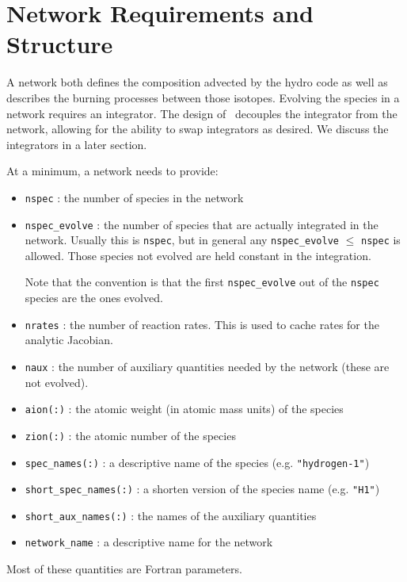 

\section{Network Requirements and Structure}

A network both defines the composition advected by the hydro code as
well as describes the burning processes between those isotopes.
Evolving the species in a network requires an integrator.  The design
of \microphysics\ decouples the integrator from the network, allowing
for the ability to swap integrators as desired.  We discuss the
integrators in a later section.


At a minimum, a network needs to provide:
\begin{itemize}
 \item {\tt nspec} : the number of species in the network

 \item {\tt nspec\_evolve} : the number of species that are actually
   integrated in the network.  Usually this is {\tt nspec}, but in general
   any {\tt nspec\_evolve} $\le$ {\tt nspec} is allowed.  Those species
   not evolved are held constant in the integration.

   Note that the convention is that the first {\tt nspec\_evolve} out
   of the {\tt nspec} species are the ones evolved.

 \item {\tt nrates} : the number of reaction rates.  This is used to
   cache rates for the analytic Jacobian.

 \item {\tt naux} : the number of auxiliary quantities needed by the
   network (these are not evolved).  

 \item {\tt aion(:)} : the atomic weight (in atomic mass units) of the
   species

 \item {\tt zion(:)} : the atomic number of the species

 \item {\tt spec\_names(:)} : a descriptive name of the species
   (e.g. {\tt "hydrogen-1"})

 \item {\tt short\_spec\_names(:)} : a shorten version of the species name
   (e.g. {\tt "H1"})

 \item {\tt short\_aux\_names(:)} : the names of the auxiliary quantities

 \item {\tt network\_name} : a descriptive name for the network

\end{itemize}
Most of these quantities are Fortran parameters.

